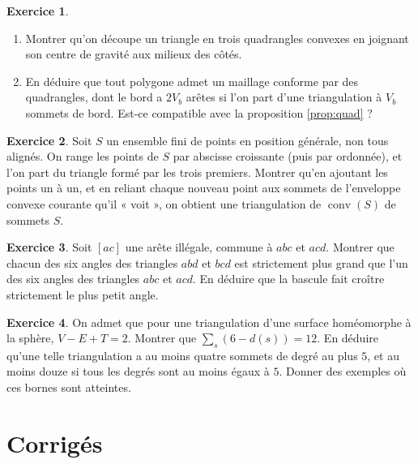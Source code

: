 \documentclass[11pt,a4paper]{article}
\theoremstyle{plain}
\theoremstyle{definition}
\newtheorem{exercice}{Exercice}
\theoremstyle{remark}
\DeclareMathOperator{\conv}{conv}
\begin{document}
\begin{exercice}\label{exo:quad}
\begin{enumerate}[nosep]
\item Montrer qu'on découpe un triangle en trois quadrangles convexes en joignant son centre de gravité aux milieux des côtés.
\item En déduire que tout polygone admet un maillage conforme par des quadrangles, dont le bord a $2V_b$ arêtes si l'on part d'une triangulation à $V_b$ sommets de bord. Est-ce compatible avec la proposition \ref{prop:quad} ?
\end{enumerate}
\end{exercice}

\begin{exercice}\label{exo:existence}
Soit $S$ un ensemble fini de points en position générale, non tous alignés. On range les points de $S$ par abscisse croissante (puis par ordonnée), et l'on part du triangle formé par les trois premiers. Montrer qu'en ajoutant les points un à un, et en reliant chaque nouveau point aux sommets de l'enveloppe convexe courante qu'il « voit », on obtient une triangulation de $\conv(S)$ de sommets $S$.
\end{exercice}

\begin{exercice}\label{exo:angles}
Soit $[ac]$ une arête illégale, commune à $abc$ et $acd$. Montrer que chacun des six angles des triangles $abd$ et $bcd$ est strictement plus grand que l'un des six angles des triangles $abc$ et $acd$. En déduire que la bascule fait croître strictement le plus petit angle.
\end{exercice}

\begin{exercice}\label{exo:sphere}
On admet que pour une triangulation d'une surface homéomorphe à la sphère, $V-E+T=2$. Montrer que $\sum_s(6-d(s))=12$. En déduire qu'une telle triangulation a au moins quatre sommets de degré au plus $5$, et au moins douze si tous les degrés sont au moins égaux à $5$. Donner des exemples où ces bornes sont atteintes.
\end{exercice}

\section{Corrigés}
\end{document}
